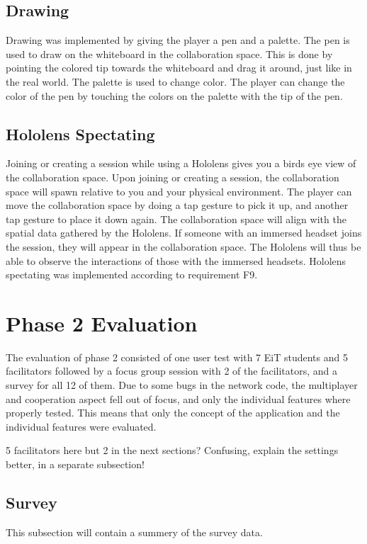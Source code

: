         \subsection{Drawing}
        Drawing was implemented by giving the player a pen and a palette. The pen is used to draw on the whiteboard in the collaboration space. This is done by pointing the colored tip towards the whiteboard and drag it around, just like in the real world. The palette is used to change color. The player can change the color of the pen by touching the colors on the palette with the tip of the pen.  %
        
        \subsection{Hololens Spectating}
        Joining or creating a session while using a Hololens gives you a birds eye view of the collaboration space. Upon joining or creating a session, the collaboration space will spawn relative to you and your physical environment. The player can move the collaboration space by doing a tap gesture to pick it up, and another tap gesture to place it down again. The collaboration space will align with the spatial data gathered by the Hololens. If someone with an immersed headset joins the session, they will appear in the collaboration space. The Hololens will thus be able to observe the interactions of those with the immersed headsets. Hololens spectating was implemented according to requirement F9.
    
    \section{Phase 2 Evaluation}
    The evaluation of phase 2 consisted of one user test with 7 EiT students and 5 facilitators followed by a focus group session with 2 of the facilitators, and a survey for all 12 of them.
    Due to some bugs in the network code, the multiplayer and cooperation aspect fell out of focus, and only the individual features where properly tested. This means that only the concept of the application and the individual features were evaluated.
    
    5 facilitators here but 2 in the next sections? Confusing, explain the settings better, in a separate subsection!
    
        \subsection{Survey} %
        This subsection will contain a summery of the survey data.
        
